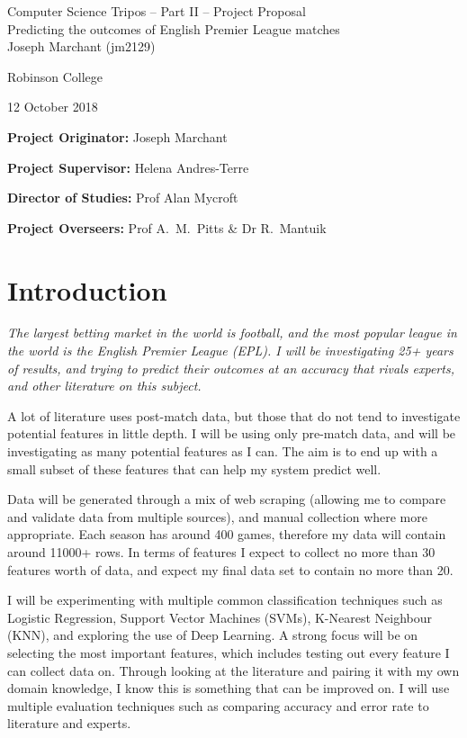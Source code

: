 \documentclass[12pt,a4paper,twoside]{article}
\begin{document}
\begin{center}
\Large
Computer Science Tripos -- Part II -- Project Proposal\\[4mm]
\LARGE
Predicting the outcomes of English Premier League matches\\[4mm]

\large
Joseph Marchant (jm2129)

Robinson College

12 October 2018
\end{center}

\vspace{5mm}

\textbf{Project Originator:} Joseph Marchant

\textbf{Project Supervisor:} Helena Andres-Terre

\textbf{Director of Studies:} Prof Alan Mycroft

\textbf{Project Overseers:} Prof A.~M.~Pitts  \& Dr R.~Mantuik


\section*{Introduction}

\emph{The largest betting market in the world is football, and the most popular league in the world is the English Premier League (EPL). I will be investigating 25+ years of results, and trying to predict their outcomes at an accuracy that rivals experts, and other literature on this subject.}

A lot of literature uses post-match data, but those that do not tend to investigate potential features in little depth. I will be using only pre-match data, and will be investigating as many potential features as I can. The aim is to end up with a small subset of these features that can help my system predict well. 

Data will be generated through a mix of web scraping (allowing me to compare and validate data from multiple sources), and manual collection where more appropriate. Each season has around 400 games, therefore my data will contain around 11000+ rows. In terms of features I expect to collect no more than 30 features worth of data, and expect my final data set to contain no more than 20.

I will be experimenting with multiple common classification techniques such as Logistic Regression, Support Vector Machines (SVMs), K-Nearest Neighbour (KNN), and exploring the use of Deep Learning. A strong focus will be on selecting the most important features, which includes testing out every feature I can collect data on. Through looking at the literature and pairing it with my own domain knowledge, I know this is something that can be improved on. I will use multiple evaluation techniques such as comparing accuracy and error rate to literature and experts.
\end{document}

